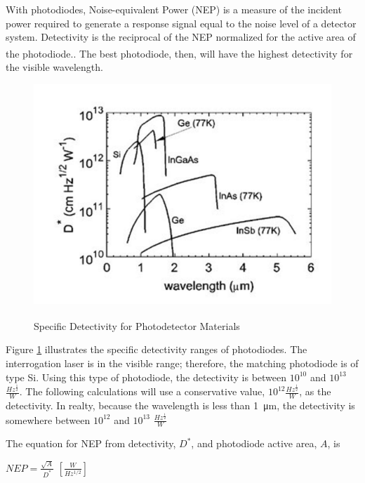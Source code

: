\documentclass[letterpaper,10pt]{article}
\begin{document}
\begin{spacing}{1.15}
With photodiodes, Noise-equivalent Power (NEP) is a measure of the incident power required to generate a response signal equal to the noise level of a detector system. Detectivity is the reciprocal of the NEP normalized for the active area of the photodiode.\textsuperscript{\cite{Microphotonics}}. The best photodiode, then, will have the highest detectivity for the visible wavelength.  

\begin{figure} [H]
	\centering
	\includegraphics[scale=0.4]{detectivity-table.png}
	\label{fig:detectivity-table}
	\caption{Specific Detectivity for Photodetector Materials \textsuperscript{\cite{Optical}} \label{fig:detectivity-table}}
\end{figure}

Figure \ref{fig:detectivity-table} illustrates the specific detectivity ranges of photodiodes. The interrogation laser is in the visible range; therefore, the matching photodiode is of type Si. Using this type of photodiode, the detectivity is between $10^{10}$ and $10^{13}$ $\frac{Hz^{\frac{1}{2}}}{W}$. The following calculations will use a conservative value, $10^{12} \frac{Hz^{\frac{1}{2}}}{W}$, as the detectivity. In realty, because the wavelength is less than \SI{1}{\micro\meter}, the detectivity is somewhere between $10^{12}$ and $10^{13}$ $\frac{Hz^{\frac{1}{2}}}{W}$

The equation for NEP from detectivity, $D^*$, and photodiode active area, $A$,  is 
\begin{center}
	{\large $NEP = \frac{\sqrt{A}}{D^*}$}  $[\frac{W}{Hz^{1/2}}]$
\end{center}


\end{spacing}
\end{document}
